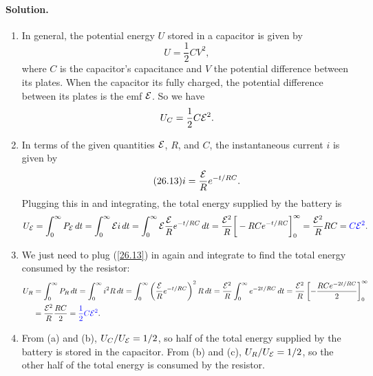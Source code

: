 \documentclass[11pt]{article}
\newcommand{\refeq}[1]{(\ref{#1})}
\newcommand{\beq}{\begin{equation*}}
\newcommand{\eeq}{\end{equation*}}
\newcommand{\beqn}{\begin{equation}}
\newcommand{\eeqn}{\end{equation}}
\newenvironment{solution}
{
    \paragraph{Solution.}
    \ignorespaces
}
{
    \bigskip
}
\begin{document}
\begin{solution}
	\begin{enumerate}
		\item In general, the potential energy $U$ stored in a capacitor is given by
		\beqn \tag{24.9}
			U = \frac{1}{2} C V^2,
		\eeqn
		where $C$ is the capacitor's capacitance and $V$ the potential difference between its plates.  When the capacitor its fully charged, the potential difference between its plates is the emf $\mathcal{E}$.  So we have
		{\color{blue} \beq
			\UC = \frac{1}{2} C \cE^2.
		\eeq }
	
		\item In terms of the given quantities $\mathcal{E}$, $R$, and $C$, the instantaneous current $i$ is given by
		\beq \label{26.13} \tag{26.13}
			i = \frac{\cE}{R} e^{-t / RC}.
		\eeq
		Plugging this in and integrating, the total energy supplied by the battery is
		\beq
			\UcE = \intoi \PcE \dt
			= \intoi \cE i \dt
			= \intoi \cE \frac{\cE}{R} e^{-t / RC} \dt
			= \frac{\cE^2}{R} \bigg[ - RC e^{-t / RC} \bigg]_0^\infty
			= \frac{\cE^2}{R} R C
			= {\color{blue} C \cE^2}.
		\eeq
		
		\item We just need to plug \refeq{26.13} in again and integrate to find the total energy consumed by the resistor:
		\begin{align*}
			U_R &= \int_0^\infty P_R \dd{t}
			= \int_0^\infty i^2 R \dd{t}
			= \int_0^\infty \left( \frac{\mathcal{E}}{R} e^{-t / RC} \right)^2 R \dd{t}
			= \frac{\mathcal{E}^2}{R} \int_0^\infty e^{-2t / RC} \dd{t}
			= \frac{\mathcal{E}^2}{R} \left[ -\frac{RC e^{-2t / RC}}{2} \right]_0^\infty \\
			&= \frac{\mathcal{E}^2}{R} \frac{RC}{2}
			= {\color{blue} \frac{1}{2} C \mathcal{E}^2}.
		\end{align*}
		
		\item From (a) and (b), $U_C / U_{\mathcal{E}} = 1/2$, so {\color{blue} half} of the total energy supplied by the battery is stored in the capacitor.  From (b) and (c), $U_R / U_{\mathcal{E}} = 1/2$, so the other {\color{blue} half} of the total energy is consumed by the resistor.
	\end{enumerate}
\end{solution}



\clearpage
\end{document}
